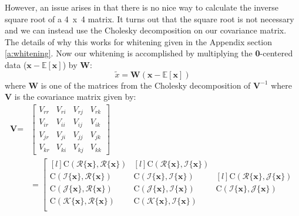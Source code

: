 However, an issue arises in that there is no nice way to calculate the inverse square root of a 4~x~4 matrix.
It turns out that the square root is not necessary and we can instead use the Cholesky decomposition on our covariance matrix.
The details of why this works for whitening given in the Appendix section \ref{a:whitening}.
Now our whitening is accomplished by multiplying the \textbf{0}-centered data ($\textbf{x} - \mathbb{E}[\textbf{x}]$) by \textbf{W}:
\begin{equation}
\tilde{x} = \textbf{W}(\textbf{x} - \mathbb{E}[\textbf{x}])
\label{eq:white4d}
\end{equation}
where \textbf{W} is one of the matrices from the Cholesky decomposition of $\textbf{V}^{-1}$ where \textbf{V} is the covariance matrix given by:
\begin{align*}
\textbf{V}
=&
\begin{bmatrix}
 V_{rr} & V_{ri} & V_{rj} & V_{rk} \\
 V_{ir} & V_{ii} & V_{ij} & V_{ik} \\
 V_{jr} & V_{ji} & V_{jj} & V_{jk} \\
 V_{kr} & V_{ki} & V_{kj} & V_{kk}
\end{bmatrix} \nonumber \\
&=\left[ 
\begin{matrix*}[l]
\mbox{C}(\mathscr{R}\{\textbf{x}\}, \mathscr{R}\{\textbf{x}\}) \\
\mbox{C}(\mathscr{I}\{\textbf{x}\}, \mathscr{R}\{\textbf{x}\}) \\
\mbox{C}(\mathscr{J}\{\textbf{x}\}, \mathscr{R}\{\textbf{x}\}) \\
\mbox{C}(\mathscr{K}\{\textbf{x}\}, \mathscr{R}\{\textbf{x}\}) \\
\end{matrix*} \right. \nonumber 
\begin{matrix*}[l]
\mbox{C}(\mathscr{R}\{\textbf{x}\}, \mathscr{I}\{\textbf{x}\}) \\
\mbox{C}(\mathscr{I}\{\textbf{x}\}, \mathscr{I}\{\textbf{x}\}) \\
\mbox{C}(\mathscr{J}\{\textbf{x}\}, \mathscr{I}\{\textbf{x}\}) \\
\mbox{C}(\mathscr{K}\{\textbf{x}\}, \mathscr{I}\{\textbf{x}\}) \\
\end{matrix*} \nonumber 
\begin{matrix*}[l]
\mbox{C}(\mathscr{R}\{\textbf{x}\}, \mathscr{J}\{\textbf{x}\}) \\
\mbox{C}(\mathscr{I}\{\textbf{x}\}, \mathscr{J}\{\textbf{x}\}) \\

\end{matrix*}
\end{align*}
